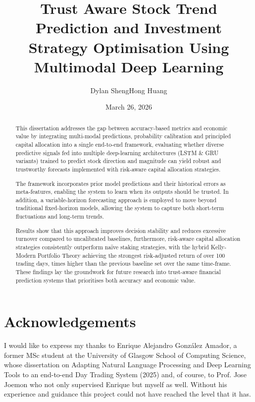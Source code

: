 \documentclass{l4proj}
\begin{document}
\title{Trust Aware Stock Trend Prediction and Investment Strategy Optimisation Using Multimodal Deep Learning}
\author{Dylan ShengHong Huang}
\date{March 26, 2026}

\maketitle

\begin{abstract}
This dissertation addresses the gap between accuracy-based metrics and economic value by integrating multi-modal predictions, probability calibration and principled capital allocation into a single end-to-end framework, evaluating whether diverse predictive signals fed into multiple deep-learning architectures (LSTM \& GRU variants) trained to predict stock direction and magnitude can yield robust and trustworthy forecasts implemented with risk-aware capital allocation strategies.

The framework incorporates prior model predictions and their historical errors as meta-features, enabling the system to learn when its outputs should be trusted. In addition, a variable-horizon forecasting approach is employed to move beyond traditional fixed-horizon models, allowing the system to capture both short-term fluctuations and long-term trends.

Results show that this approach improves decision stability and reduces excessive turnover compared to uncalibrated baselines, furthermore, risk-aware capital allocation strategies consistently outperform naïve staking strategies, with the hybrid Kelly-Modern Portfolio Theory achieving the strongest risk-adjusted return of  over 100 trading days,  times higher than the previous baseline set over the same time-frame. These findings lay the groundwork for future research into trust-aware financial prediction systems that prioritises both accuracy and economic value.
\end{abstract}

\chapter*{Acknowledgements}
I would like to express my thanks to Enrique Alejandro González Amador, a former MSc student at the University of Glasgow School of Computing Science, whose dissertation on Adapting Natural Language Processing and Deep Learning Tools to an end-to-end Day Trading System (2025) and, of course, to Prof. Jose Joemon who not only supervised Enrique but myself as well. Without his experience and guidance this project could not have reached the level that it has.
\end{document}
